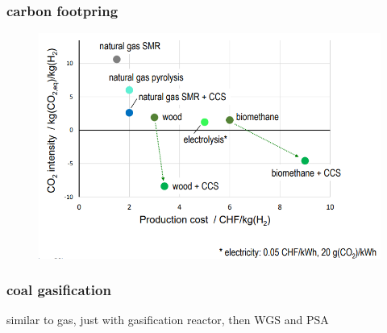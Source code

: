 \documentclass[a4paper,10pt,landscape]{scrartcl}
\begin{document}
\begin{multicols*}{3}
\subsubsection{carbon footpring}
\begin{figure}[H]
    \centering
    \includegraphics[width=1\linewidth]{src/h2_prod_GHG.png}
\end{figure}

\subsubsection{coal gasification}
similar to gas, just with gasification reactor, then WGS and PSA

%

\end{multicols*}
\end{document}
